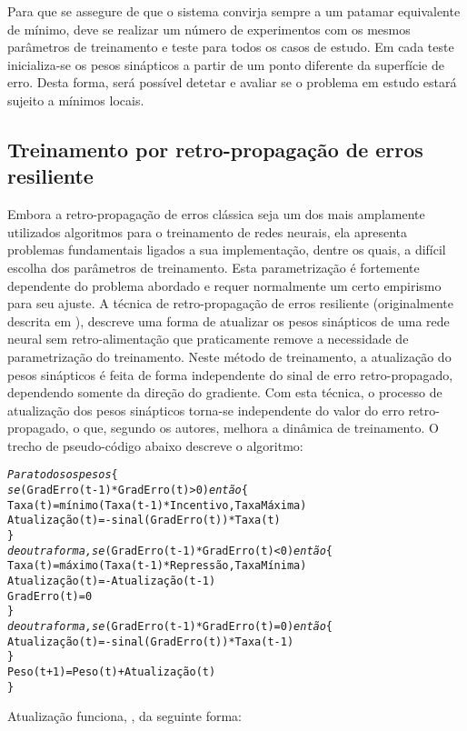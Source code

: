 Para que se assegure de que o sistema convirja sempre a um patamar equivalente
de mínimo, deve se realizar um número de experimentos com os mesmos parâmetros
de treinamento e teste para todos os casos de estudo. Em cada teste
inicializa-se os pesos sinápticos a partir de um ponto diferente da superfície
de erro. Desta forma, será possível detetar e avaliar se o problema em estudo
estará sujeito a mínimos locais.

\subsection{Treinamento por retro-propagação de erros resiliente}

Embora a retro-propagação de erros clássica seja um dos mais amplamente
utilizados algoritmos para o treinamento de redes neurais, ela apresenta
problemas fundamentais ligados a sua implementação, dentre os quais, a difícil
escolha dos parâmetros de treinamento. Esta parametrização é fortemente
dependente do problema abordado e requer normalmente um certo empirismo para
seu ajuste. A técnica de retro-propagação de erros resiliente (originalmente
descrita em
\cite{rprop}), descreve uma forma de atualizar os pesos sinápticos de uma rede
neural sem retro-alimentação que praticamente remove a necessidade de
parametrização do treinamento. Neste método de treinamento, a atualização do
pesos sinápticos é feita de forma independente do sinal de erro
retro-propagado, dependendo somente da direção do gradiente. Com esta técnica,
o processo de atualização dos pesos sinápticos torna-se independente do valor
do erro retro-propagado, o que, segundo os autores, melhora a dinâmica de
treinamento. O trecho de pseudo-código abaixo descreve o algoritmo:

\begin{alltt}
\textit{Para todos os pesos} \{
  \textit{se} (GradErro(t-1) * GradErro(t) > 0) \textit{então} \{
    Taxa(t) = mínimo(Taxa(t-1) * Incentivo, TaxaMáxima)
    Atualização(t) = -sinal(GradErro(t)) * Taxa(t)
  \}
  \textit{de outra forma, se} (GradErro(t-1) * GradErro(t) < 0) \textit{então} \{
    Taxa(t) = máximo(Taxa(t-1) * Repressão, TaxaMínima)
    Atualização(t) = -Atualização(t-1)
    GradErro(t) = 0
  \}
  \textit{de outra forma, se} (GradErro(t-1) * GradErro(t) = 0) \textit{então} \{
    Atualização(t) = -sinal(GradErro(t)) * Taxa(t-1)
  \}
  Peso(t+1) = Peso(t) + Atualização(t)
\}
\end{alltt}

Atualização funciona, , da seguinte forma: 

